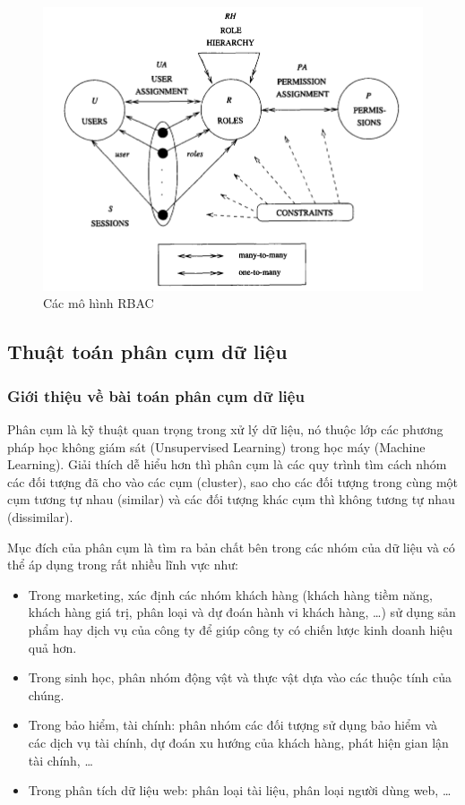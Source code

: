 \begin{figure}[H]
\centering
\includegraphics[width=12cm]{images/RBAC.png}
\caption{Các mô hình RBAC}
\end{figure}

\subsection{Thuật toán phân cụm dữ liệu}
\subsubsection{Giới thiệu về bài toán phân cụm dữ liệu}
Phân cụm là kỹ thuật quan trọng trong xử lý dữ liệu, nó thuộc lớp
các phương pháp học không giám sát (Unsupervised Learning) trong học
máy (Machine Learning). Giải thích dễ hiểu hơn thì phân cụm là
các quy trình tìm cách nhóm các đối tượng đã cho vào các cụm (cluster),
sao cho các đối tượng trong cùng một cụm tương tự nhau (similar) và
các đối tượng khác cụm thì không tương tự nhau (dissimilar).

Mục đích của phân cụm là tìm ra bản chất bên trong các
nhóm của dữ liệu và có thể  áp dụng trong rất nhiều lĩnh vực như:
\begin{itemize}[topsep=0ex]
\item Trong marketing, xác định các nhóm khách hàng (khách hàng tiềm
    năng, khách hàng giá trị, phân loại và dự đoán hành vi khách
    hàng, …) sử dụng sản phẩm hay dịch vụ của công ty để giúp
    công ty có chiến lược kinh doanh hiệu quả hơn.

\item Trong sinh học, phân nhóm động vật và thực vật
    dựa vào các thuộc tính của chúng.

\item  Trong bảo hiểm, tài chính: phân nhóm các đối tượng
    sử dụng bảo hiểm và các dịch vụ tài chính, dự đoán xu hướng
    của khách hàng, phát hiện gian lận tài chính, …

\item Trong phân tích dữ liệu web: phân loại tài liệu, phân
    loại người dùng web, …
\end{itemize}

